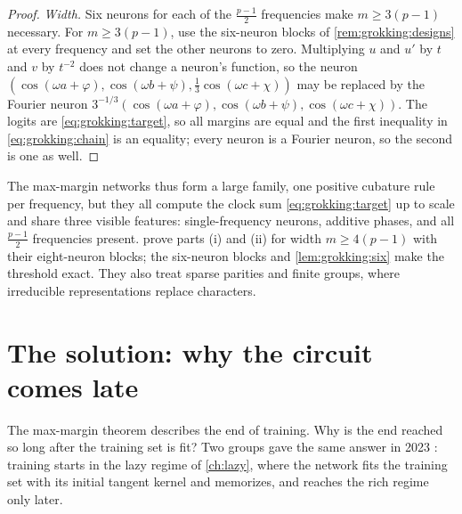 \begin{refsection}
\begin{proof}
\emph{Width.} Six neurons for each of the $\frac{p-1}2$ frequencies make $m\ge3(p-1)$ necessary. For $m\ge3(p-1)$, use the six-neuron blocks of \cref{rem:grokking:designs} at every frequency and set the other neurons to zero. Multiplying $u$ and $u'$ by $t$ and $v$ by $t^{-2}$ does not change a neuron's function, so the neuron $(\cos(\omega a+\varphi),\cos(\omega b+\psi),\frac13\cos(\omega c+\chi))$ may be replaced by the Fourier neuron $3^{-1/3}(\cos(\omega a+\varphi),\cos(\omega b+\psi),\cos(\omega c+\chi))$. The logits are \eqref{eq:grokking:target}, so all margins are equal and the first inequality in \eqref{eq:grokking:chain} is an equality; every neuron is a Fourier neuron, so the second is one as well.
\end{proof}

The max-margin networks thus form a large family, one positive cubature rule per frequency, but they all compute the clock sum \eqref{eq:grokking:target} up to scale and share three visible features: single-frequency neurons, additive phases, and all $\frac{p-1}2$ frequencies present. \Textcite{MorwaniEtAl2024} prove parts (i) and (ii) for width $m\ge4(p-1)$ with their eight-neuron blocks; the six-neuron blocks and \cref{lem:grokking:six} make the threshold exact. They also treat sparse parities and finite groups, where irreducible representations replace characters.

\section{The solution: why the circuit comes late}\label{sec:grokking:delay}

The max-margin theorem describes the end of training. Why is the end reached so long after the training set is fit? Two groups gave the same answer in 2023 \parencite{LyuEtAl2024,KumarEtAl2024}: training starts in the lazy regime of \cref{ch:lazy}, where the network fits the training set with its initial tangent kernel and memorizes, and reaches the rich regime only later.


\end{refsection}
